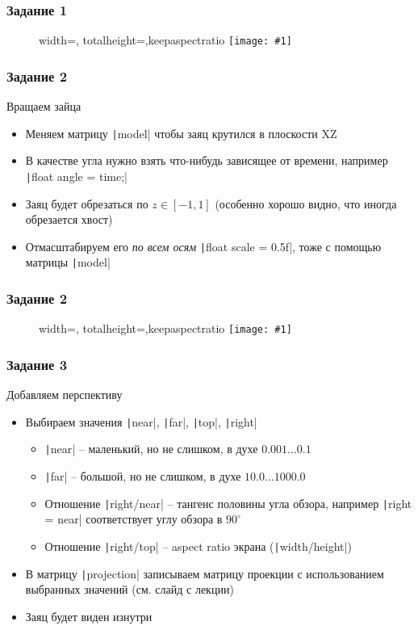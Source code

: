\documentclass[10pt]{beamer}
\newcommand{\slideimage}[1]{
  \begin{figure}
    \begin{adjustbox}{width=\textwidth, totalheight=\textheight-2\baselineskip-2\baselineskip,keepaspectratio}
      \texttt{[image: \#1]}
    \end{adjustbox}
  \end{figure}
}
\begin{document}
\begin{frame}[fragile]
\frametitle{Задание 1}
\slideimage{1.png}
\end{frame}

\begin{frame}[fragile]
\frametitle{Задание 2}
Вращаем зайца
\begin{itemize}
\item Меняем матрицу \texttt|model| чтобы заяц крутился в плоскости XZ
\item В качестве угла нужно взять что-нибудь зависящее от времени, например \texttt|float angle = time;|
\item Заяц будет обрезаться по \begin{math}z \in [-1, 1]\end{math} (особенно хорошо видно, что иногда обрезается хвост)
\item Отмасштабируем его \textit{по всем осям} \texttt|float scale = 0.5f|, тоже с помощью матрицы \texttt|model|
\end{itemize}
\end{frame}

\begin{frame}[fragile]
\frametitle{Задание 2}
\slideimage{2.png}
\end{frame}

\begin{frame}[fragile]
\frametitle{Задание 3}
Добавляем перспективу
\begin{itemize}
\item Выбираем значения \texttt|near|, \texttt|far|, \texttt|top|, \texttt|right|
\begin{itemize}
\item \texttt|near| -- маленький, но не слишком, в духе \begin{math}0.001 \dots 0.1\end{math}
\item \texttt|far| -- большой, но не слишком, в духе \begin{math}10.0 \dots 1000.0\end{math}
\item Отношение \texttt|right/near| -- тангенс половины угла обзора, например \texttt|right = near| соответствует углу обзора в \begin{math}90^\circ\end{math}
\item Отношение \texttt|right/top| -- aspect ratio экрана (\texttt|width/height|)
\end{itemize}
\item В матрицу \texttt|projection| записываем матрицу проекции с использованием выбранных значений (см. слайд с лекции)
\item Заяц будет виден изнутри
\end{itemize}
\end{frame}
\end{document}
